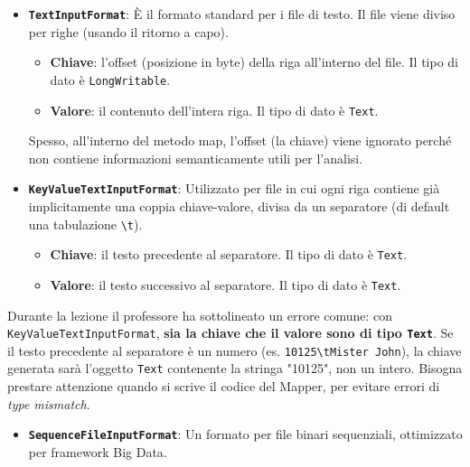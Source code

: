 \begin{itemize}
    \item \textbf{\texttt{TextInputFormat}}: È il formato standard per i file di testo. Il file viene diviso per righe (usando il ritorno a capo). 
    \begin{itemize}
        \item \textbf{Chiave}: l'offset (posizione in byte) della riga all'interno del file. Il tipo di dato è \texttt{LongWritable}.
        \item \textbf{Valore}: il contenuto dell'intera riga. Il tipo di dato è \texttt{Text}.
    \end{itemize}
    Spesso, all'interno del metodo map, l'offset (la chiave) viene ignorato perché non contiene informazioni semanticamente utili per l'analisi.

    \item \textbf{\texttt{KeyValueTextInputFormat}}: Utilizzato per file in cui ogni riga contiene già implicitamente una coppia chiave-valore, divisa da un separatore (di default una tabulazione \texttt{\textbackslash t}).
    \begin{itemize}
        \item \textbf{Chiave}: il testo precedente al separatore. Il tipo di dato è \texttt{Text}.
        \item \textbf{Valore}: il testo successivo al separatore. Il tipo di dato è \texttt{Text}.
    \end{itemize}
\end{itemize}

\begin{remark}
Durante la lezione il professore ha sottolineato un errore comune: con \texttt{KeyValueTextInputFormat}, \textbf{sia la chiave che il valore sono di tipo \texttt{Text}}. Se il testo precedente al separatore è un numero (es. \texttt{10125\textbackslash tMister John}), la chiave generata sarà l'oggetto \texttt{Text} contenente la stringa "10125", non un intero. Bisogna prestare attenzione quando si scrive il codice del Mapper, per evitare errori di \textit{type mismatch}.
\end{remark}

\begin{itemize}
    \item \textbf{\texttt{SequenceFileInputFormat}}: Un formato per file binari sequenziali, ottimizzato per framework Big Data.
\end{itemize}

